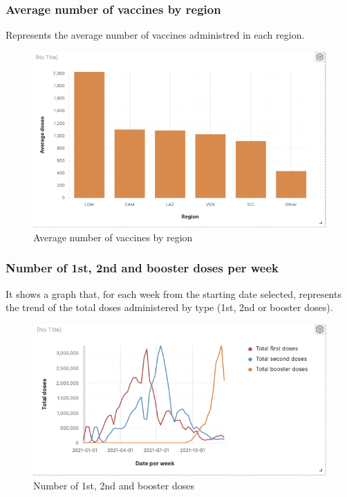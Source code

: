 \documentclass[12pt, a4paper]{article}
\begin{document}
\subsubsection{Average number of vaccines by region}
Represents the average number of vaccines administred in each region.
\begin{figure}[H]
  \centering
  \includegraphics[width=.8\linewidth]{img (10).png}
\caption*{Average number of vaccines by region}
\end{figure}

\subsubsection{Number of 1st, 2nd and booster doses per week}
It shows a graph that, for each week from the starting date selected, represents the 
trend of the total doses administered by type (1st, 2nd or booster doses).
\begin{figure}[H]
  \centering
  \includegraphics[width=.9\linewidth]{img (11).png}
\caption*{Number of 1st, 2nd and booster doses}
\end{figure}
\end{document}
